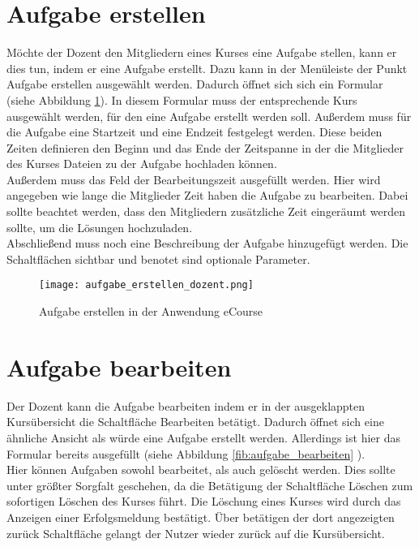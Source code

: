 \section{Aufgabe erstellen}
Möchte der Dozent den Mitgliedern eines Kurses eine Aufgabe stellen, kann er dies tun, indem er eine Aufgabe erstellt. Dazu kann in der Menüleiste der Punkt \glqq Aufgabe erstellen\grqq\; ausgewählt werden. Dadurch öffnet sich sich ein Formular (siehe Abbildung \ref{fib:aufgabe_anlegen}). 
In diesem Formular muss der entsprechende Kurs ausgewählt werden, für den eine Aufgabe erstellt werden soll. Außerdem muss für die Aufgabe eine Startzeit und eine Endzeit festgelegt werden. Diese beiden Zeiten definieren den Beginn und das Ende der Zeitspanne in der die Mitglieder des Kurses Dateien zu der Aufgabe hochladen können. \\
Außerdem muss das Feld der Bearbeitungszeit ausgefüllt werden. Hier wird angegeben wie lange die Mitglieder Zeit haben die Aufgabe zu bearbeiten. Dabei sollte beachtet werden, dass den Mitgliedern zusätzliche Zeit eingeräumt werden sollte, um die Lösungen hochzuladen.\\
Abschließend muss noch eine Beschreibung der Aufgabe hinzugefügt werden. 
Die Schaltflächen \glqq sichtbar\grqq{} und \glqq benotet\grqq{} sind optionale Parameter.

\begin{figure}[h]
\centering
\texttt{[image: aufgabe\_erstellen\_dozent.png]}
\caption{Aufgabe erstellen in der Anwendung eCourse}
\label{fib:aufgabe_anlegen}
\end{figure}


\section{Aufgabe bearbeiten}
\label{sec:bearbeiten}
Der Dozent kann die Aufgabe bearbeiten indem er in der ausgeklappten Kursübersicht die Schaltfläche \glqq Bearbeiten\grqq{} betätigt. Dadurch öffnet sich eine ähnliche Ansicht als würde eine Aufgabe erstellt werden. Allerdings ist hier das Formular bereits ausgefüllt (siehe Abbildung \ref{fib:aufgabe_bearbeiten} ).\\
Hier können Aufgaben sowohl bearbeitet, als auch gelöscht werden. 
Dies sollte unter größter Sorgfalt geschehen, da die Betätigung der Schaltfläche \glqq Löschen\grqq{} zum sofortigen Löschen des Kurses führt. Die Löschung eines Kurses wird durch das Anzeigen einer Erfolgsmeldung bestätigt. Über betätigen der dort angezeigten \glqq zurück\grqq{} Schaltfläche gelangt der Nutzer wieder zurück auf die Kursübersicht.

